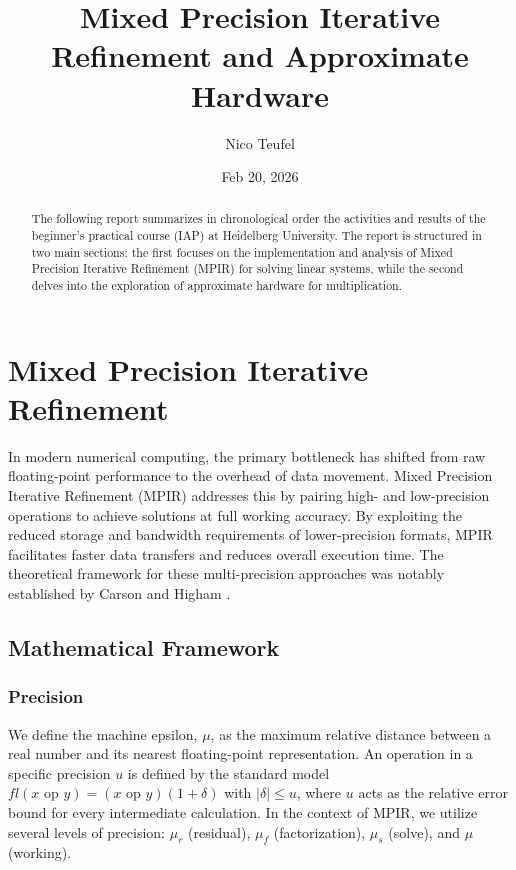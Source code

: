 \documentclass[a4paper,11pt]{article}
\title{Mixed Precision Iterative Refinement and Approximate Hardware}
\author{Nico Teufel}
\date{Feb 20, 2026}
\begin{document}
\maketitle

\begin{abstract}
  The following report summarizes in chronological order the activities and results of the beginner's practical course (IAP) at Heidelberg University.
  The report is structured in two main sections: the first focuses on the implementation
  and analysis of Mixed Precision Iterative Refinement (MPIR) for solving linear systems,
  while the second delves into the exploration of approximate hardware for multiplication.
\end{abstract}

\section{Mixed Precision Iterative Refinement}

In modern numerical computing, the primary bottleneck has shifted from raw floating-point performance to the overhead of data movement.
Mixed Precision Iterative Refinement (MPIR) addresses this by pairing high- and low-precision operations to achieve
solutions at full working accuracy. By exploiting the reduced storage and bandwidth requirements of lower-precision formats,
MPIR facilitates faster data transfers and reduces overall execution time.
The theoretical framework for these multi-precision approaches was notably established
by Carson and Higham \cite{Carson2018}.

\subsection{Mathematical Framework}

\subsubsection{Precision}

We define the machine epsilon, $\mu$, as the maximum relative distance between a real
number and its nearest floating-point representation.
An operation in a specific precision $u$ is defined by the standard model
$fl(x \text{ op } y) = (x \text{ op } y)(1 + \delta)$ with $|\delta| \le u$,
where $u$ acts as the relative error bound for every intermediate calculation.
In the context of MPIR, we utilize several levels of precision:
$\mu_r$ (residual), $\mu_f$ (factorization), $\mu_s$ (solve), and $\mu$ (working).
\end{document}
